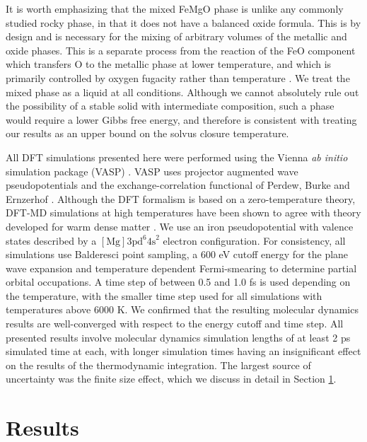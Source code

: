 It is worth emphasizing that the mixed FeMgO phase is unlike any commonly studied rocky
phase, in that it does not have a balanced oxide formula. This is by design and is
necessary for the mixing of arbitrary volumes of the metallic and oxide phases.  This is
a separate process from the reaction of the FeO component which transfers O to the
metallic phase at lower temperature, and which is primarily controlled by oxygen fugacity
rather than temperature \citep{Tsuno2013}. We treat the mixed phase as a liquid at all
conditions.  Although we cannot absolutely rule out the possibility of a stable solid
with intermediate composition, such a phase would require a lower Gibbs free energy, and
therefore is consistent with treating our results as an upper bound on the solvus closure
temperature.


All DFT simulations presented here were performed using the Vienna {\it ab initio}
simulation package (VASP) \citep{Kresse1996}. VASP uses projector augmented wave
pseudopotentials \citep{Blochl1994} and the exchange-correlation functional of Perdew,
Burke and Ernzerhof \citep{Perdew1996}. Although the DFT formalism is based on a
zero-temperature theory, DFT-MD simulations at high temperatures have been shown to agree
with theory developed for warm dense matter \citep{Driver2012}. We use an iron
pseudopotential with valence states described by a
$[\mathrm{Mg}]\mathrm{3pd}^6\mathrm{4s}^2$ electron configuration.  For consistency, all
simulations use Balderesci point sampling, a 600 eV cutoff energy for the plane wave
expansion and temperature dependent Fermi-smearing to determine partial orbital
occupations. A time step of between 0.5 and 1.0 fs is used depending on the temperature,
with the smaller time step used for all simulations with temperatures above 6000 K. We
confirmed that the resulting molecular dynamics results are well-converged with respect
to the energy cutoff and time step.  All presented results involve molecular
dynamics simulation 
lengths of at least 2 ps simulated time at each, with longer simulation times having an
insignificant effect on the results of the thermodynamic integration. The largest source
of uncertainty was the finite size effect, which we discuss in detail in
Section \ref{sec:results}.


\section{Results} \label{sec:results}

